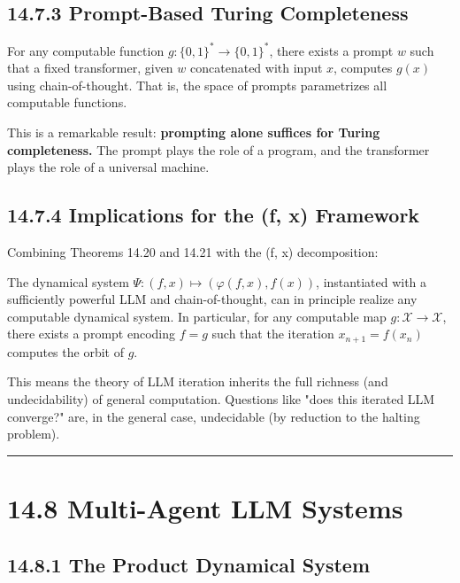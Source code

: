 \subsection{14.7.3 Prompt-Based Turing Completeness}

\begin{theorem}[Qiu et al., 2024]
For any computable function $g: \{ 0,1\} ^* \to \{ 0,1\} ^*$, there exists a prompt $w$ such that a fixed transformer, given $w$ concatenated with input $x$, computes $g(x)$ using chain-of-thought. That is, the space of prompts parametrizes all computable functions.

This is a remarkable result: \textbf{prompting alone suffices for Turing completeness.} The prompt plays the role of a program, and the transformer plays the role of a universal machine.
\end{theorem}

\subsection{14.7.4 Implications for the (f, x) Framework}

Combining Theorems 14.20 and 14.21 with the (f, x) decomposition:

\begin{corollary}
The dynamical system $\Psi: (f, x) \mapsto (\varphi(f, x), f(x))$, instantiated with a sufficiently powerful LLM and chain-of-thought, can in principle realize any computable dynamical system. In particular, for any computable map $g: \mathcal{X} \to \mathcal{X}$, there exists a prompt encoding $f = g$ such that the iteration $x_{n+1} = f(x_n)$ computes the orbit of $g$.

This means the theory of LLM iteration inherits the full richness (and undecidability) of general computation. Questions like "does this iterated LLM converge?" are, in the general case, undecidable (by reduction to the halting problem).

\bigskip\hrule\bigskip
\end{corollary}

\section{14.8 Multi-Agent LLM Systems}

\subsection{14.8.1 The Product Dynamical System}

